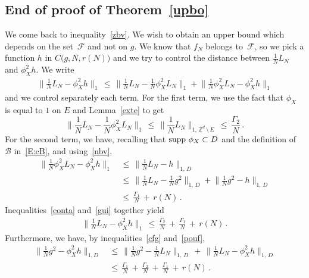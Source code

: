 \documentclass[10pt]{amsart}
\theoremstyle{definition}\newtheorem{defi}[theo]{Definition}\newtheorem{rema}[theo]{Remark}\newtheorem{exam}[theo]{Example}\newtheorem{exem}[theo]{Example}\newtheorem{nota}[theo]{Notation}
\newcommand*\supp{\text{supp\,}}
\newcommand*\Zd {{\mathbb Z^d}}
\newcommand{\cB}{\mathcal{B}}
\newcommand{\cF}{\mathcal{F}}
\begin{document}
\subsection{End of proof of Theorem~\ref{upbo}}\label{conc}
We come back to inequality~\eqref{zbv}. We wish to obtain an upper bound which depends on the set~$\cF$ and not on $g$. We know that $f_N$ belongs to~$\cF$, so we pick a function $h$ in $C\big(g,N, r(N)\big)$ and we try to control the distance between $\frac{1}{N}L_N$ and $\phi_X^2h$. We write
\begin{align*}
\Big\|\frac{1}{N}L_N-\phi_X^2h\Big\|_{1}
\,\leq\,
\Big\|\frac{1}{N}L_N-
\frac{1}{N}
\phi_X^2 L_N
\Big\|_{1} +
\Big\|\frac{1}{N}
\phi_X^2 L_N-
\phi_X^2 h\Big\|_{1}
\end{align*}
and we control separately each term. For the first term, we use the fact that $\phi_X$ is equal to $1$ on $E$ and Lemma~\ref{exte} to get
\begin{equation}\label{conta}
\Big\|\frac{1}{N}L_N-
\frac{1}{N}
\phi_X^2 L_N
\Big\|_{1}
\,\leq\, \|\frac{1}{N}L_N\|_{1,\,\Zd\,\setminus\,E}
\,\leq\,
\frac{\Gamma_2}{N}\,.
\end{equation}
For the second term, we have, recalling that $\supp\,\phi_X\subset D$ and the definition of $\cB$ in~\eqref{E:cB}, and using~\eqref{nbv},
\begin{equation}\label{gui}
\begin{aligned}
\Big\|\frac{1}{N}
\phi_X^2 L_N-
\phi_X^2 h\Big\|_{1}\,&\leq\,
\Big\|\frac{1}{N}L_N- h\Big\|_{1,\,D}\\
\,&\leq\,
\Big\|\frac{1}{N}L_N- \frac{1}{N}g^2\Big\|_{1,\,D}+
\Big\|\frac{1}{N}g^2- h\Big\|_{1,\,D}\\
\,&\leq\,
\frac{\Gamma_1}{{N}}\,+\,r(N)
\,.
\end{aligned}
\end{equation}
Inequalities~\eqref{conta} and~\eqref{gui} together yield
\begin{align}\label{pouf}
\Big\|\frac{1}{N}L_N-
\phi_X^2 h\Big\|_{1}\,\leq\,
\frac{\Gamma_2}{{N}}\,+\,
\frac{\Gamma_1}{{N}}\,+\, r(N)
\,.
\end{align}
Furthermore, we have, by inequalities~\eqref{cfg} and~\eqref{pouf},
\begin{equation}\label{aie}
\begin{aligned}
\Big\|\frac{1}{N}g^2-
\phi_X^2 h\Big\|_{1,D}&\,\leq\,
\Big\|\frac{1}{N}g^2-\frac{1}{N}L_N\Big\|_{1,\,D}\,+\,
\Big\|\frac{1}{N}L_N-
\phi_X^2 h\Big\|_{1,\,D}\\ &\,\leq\,
\frac{\Gamma_1}{{N}}\,+\,
\frac{\Gamma_2}{{N}}\,+\,
\frac{\Gamma_1}{{N}}\,+\, r(N)\,.
\end{aligned}
\end{equation}
\end{document}
